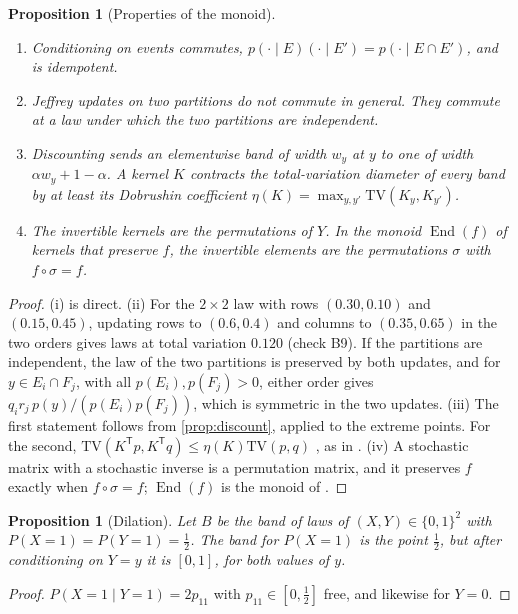 \documentclass[11pt]{article}
\newtheorem{proposition}[theorem]{Proposition}
\theoremstyle{definition}
\theoremstyle{remark}
\newcommand{\TV}{\mathrm{TV}}
\newcommand{\T}{\mathsf T}
\begin{document}
\begin{proposition}[Properties of the monoid]\label{prop:monoid}
\begin{enumerate}[label=(\roman*)]
\item Conditioning on events commutes, $p(\cdot\mid E)(\cdot\mid E')=p(\cdot\mid E\cap E')$, and is idempotent.
\item Jeffrey updates on two partitions do not commute in general. They commute at a law under which the two partitions are
  independent.
\item Discounting sends an elementwise band of width $w_y$ at $y$ to one of width $\alpha w_y+1-\alpha$. A kernel $K$ contracts the total-variation diameter of every
  band by at least its Dobrushin coefficient $\eta(K)=\max_{y,y'}\TV(K_y,K_{y'})$.
\item The invertible kernels are the permutations of $Y$. In the monoid $\operatorname{End}(f)$ of kernels that preserve $f$, the
  invertible elements are the permutations $\sigma$ with $f\circ\sigma=f$.
\end{enumerate}
\end{proposition}
\begin{proof}
(i) is direct. (ii) For the $2\times2$ law with rows $(0.30,0.10)$ and $(0.15,0.45)$, updating rows to $(0.6,0.4)$ and columns
to $(0.35,0.65)$ in the two orders gives laws at total variation $0.120$ (check B9). If the partitions are independent, the law
of the two partitions is preserved by both updates, and for $y\in E_i\cap F_j$, with all $p(E_i),p(F_j)>0$, either order gives
$q_ir_j\,p(y)/(p(E_i)p(F_j))$, which is symmetric in the two updates. (iii) The
first statement follows from \cref{prop:discount}, applied to the extreme points. For the second, $\TV(K^\T p,K^\T q)\le\eta(K)\TV(p,q)$ \cite{Dobrushin1956}, as in
\cite[Prop.~11.2]{Tower}. (iv) A stochastic matrix with a stochastic inverse is a permutation matrix, and it preserves $f$ exactly
when $f\circ\sigma=f$; $\operatorname{End}(f)$ is the monoid of \cite[Prop.~3.1]{Algebras}.
\end{proof}

\begin{proposition}[Dilation]\label{prop:dilation}
Let $B$ be the band of laws of $(X,Y)\in\{0,1\}^2$ with $P(X=1)=P(Y=1)=\frac12$. The band for $P(X=1)$ is the point $\frac12$,
but after conditioning on $Y=y$ it is $[0,1]$, for both values of $y$.
\end{proposition}
\begin{proof}
$P(X=1\mid Y=1)=2p_{11}$ with $p_{11}\in[0,\frac12]$ free, and likewise for $Y=0$.
\end{proof}
\end{document}
